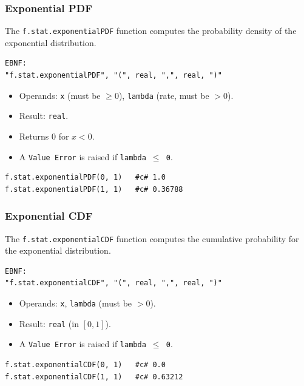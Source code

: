 \subsubsection{Exponential PDF}
The \texttt{f.stat.exponentialPDF} function computes the probability density of the exponential distribution.
\begin{verbatim}
EBNF:
"f.stat.exponentialPDF", "(", real, ",", real, ")"
\end{verbatim}
\begin{itemize}
\item Operands: \texttt{x} (must be $\geq 0$), \texttt{lambda} (rate, must be $> 0$).
\item Result: \texttt{real}.
\item Returns 0 for $x < 0$.
\item A \texttt{Value Error} is raised if \texttt{lambda $\leq$ 0}.
\end{itemize}
\begin{verbatim}
f.stat.exponentialPDF(0, 1)   #c# 1.0
f.stat.exponentialPDF(1, 1)   #c# 0.36788
\end{verbatim}

\subsubsection{Exponential CDF}
The \texttt{f.stat.exponentialCDF} function computes the cumulative probability for the exponential distribution.
\begin{verbatim}
EBNF:
"f.stat.exponentialCDF", "(", real, ",", real, ")"
\end{verbatim}
\begin{itemize}
\item Operands: \texttt{x}, \texttt{lambda} (must be $> 0$).
\item Result: \texttt{real} (in $[0, 1]$).
\item A \texttt{Value Error} is raised if \texttt{lambda $\leq$ 0}.
\end{itemize}
\begin{verbatim}
f.stat.exponentialCDF(0, 1)   #c# 0.0
f.stat.exponentialCDF(1, 1)   #c# 0.63212
\end{verbatim}

